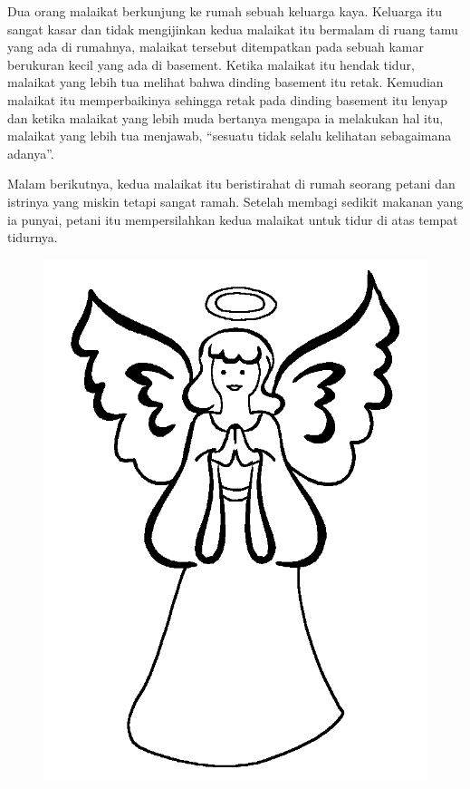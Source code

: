 
\small
Dua orang malaikat berkunjung ke rumah sebuah keluarga kaya. Keluarga itu sangat kasar dan tidak mengijinkan kedua malaikat itu bermalam di ruang tamu yang ada di rumahnya, malaikat tersebut ditempatkan pada sebuah kamar berukuran kecil yang ada di basement. Ketika malaikat itu hendak tidur, malaikat yang lebih tua melihat bahwa dinding basement itu retak. Kemudian malaikat itu memperbaikinya sehingga retak pada dinding basement itu lenyap dan ketika malaikat yang lebih muda bertanya mengapa ia melakukan hal itu, malaikat yang lebih tua menjawab, “sesuatu tidak selalu kelihatan sebagaimana adanya''.

Malam berikutnya, kedua malaikat itu beristirahat di rumah seorang petani dan istrinya yang miskin tetapi sangat ramah. Setelah membagi sedikit makanan yang ia punyai, petani itu mempersilahkan kedua malaikat untuk tidur di atas tempat tidurnya.

\begin{figure}
\centering
\includegraphics[scale=0.07]{gambar/malaikat.png}
\end{figure}

